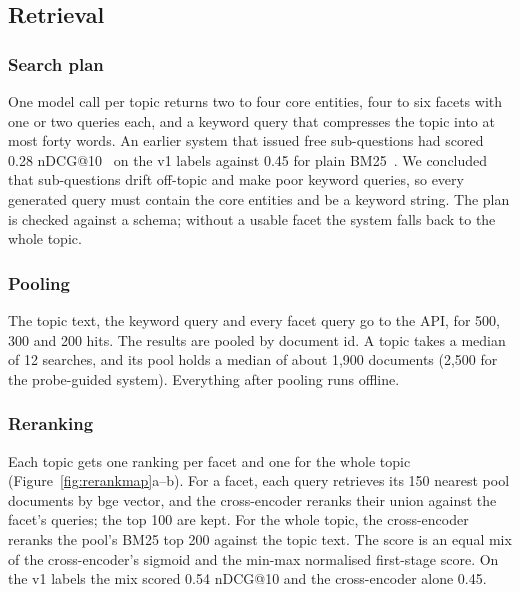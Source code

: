 \documentclass[sigconf,nonacm]{acmart}
\begin{document}
\subsection{Retrieval}

\subsubsection{Search plan}
One model call per topic returns two to four core entities, four to six facets with
one or two queries each, and a keyword query that compresses the topic into at most
forty words. An earlier system that issued free sub-questions had scored 0.28
nDCG@10~\cite{jarvelin2002cumulated} on the v1 labels against 0.45 for plain
BM25~\cite{robertson2009bm25}. We concluded that sub-questions drift off-topic and
make poor keyword queries, so every generated query must contain the core entities
and be a keyword string. The plan is checked against a schema; without a usable
facet the system falls back to the whole topic.

\subsubsection{Pooling}
The topic text, the keyword query and every facet query go to the API, for 500, 300
and 200 hits. The results are pooled by document id. A topic takes a median of 12
searches, and its pool holds a median of about 1,900 documents (2,500 for the
probe-guided system). Everything after pooling runs offline.

\subsubsection{Reranking}
Each topic gets one ranking per facet and one for the whole topic
(Figure~\ref{fig:rerankmap}a--b). For a facet, each query retrieves its 150 nearest
pool documents by bge vector, and the cross-encoder reranks their union against the
facet's queries; the top 100 are kept. For the whole topic, the cross-encoder
reranks the pool's BM25 top 200 against the topic text. The score is an equal mix of
the cross-encoder's sigmoid and the min-max normalised first-stage score. On the v1
labels the mix scored 0.54 nDCG@10 and the cross-encoder alone 0.45.
\end{document}
